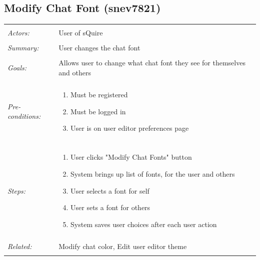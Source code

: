 \documentclass[11pt]{report}
\begin{document}
\subsection{Modify Chat Font (snev7821)}
\begin{tabular}{ p{2cm} p{12cm} }
\hline
\\
	\textit{Actors:} & User of sQuire \\
	\\
	\textit{Summary:} & User changes the chat font \\
	\\
	\textit{Goals:} & Allows user to change what chat font they see for themselves and others \\
	\\
	\textit{Pre-conditions:} & \begin{enumerate}
		\item Must be registered
		\item Must be logged in
		\item User is on user editor preferences page
	\end{enumerate} \\
	\\
	\textit{Steps:} & \begin{enumerate}
		\item User clicks "Modify Chat Fonts" button
		\item System brings up list of fonts, for the user and others
		\item User selects a font for self
		\item User sets a font for others
		\item System saves user choices after each user action
	\end{enumerate} \\
	\\
	\textit{Related:} & Modify chat color, Edit user editor theme \\
	\\
\hline
\end{tabular}
\newpage
\end{document}
